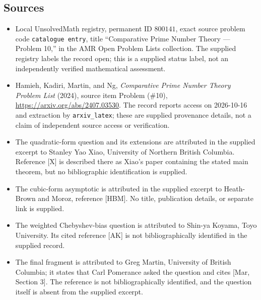 \documentclass[11pt]{article}
\begin{document}
\subsection{Sources}
\begin{itemize}
\item Local UnsolvedMath registry, permanent ID \(800141\), exact source problem code \texttt{catalogue entry}, title ``Comparative Prime Number Theory --- Problem 10,'' in the AMR Open Problem Lists collection. The supplied registry labels the record open; this is a supplied status label, not an independently verified mathematical assessment.
\item Hamieh, Kadiri, Martin, and Ng, \emph{Comparative Prime Number Theory Problem List} (2024), source item Problem (\#10), \url{https://arxiv.org/abs/2407.03530}. The record reports access on 2026-10-16 and extraction by \texttt{arxiv\_latex}; these are supplied provenance details, not a claim of independent source access or verification.
\item The quadratic-form question and its extensions are attributed in the supplied excerpt to Stanley Yao Xiao, University of Northern British Columbia. Reference [X] is described there as Xiao's paper containing the stated main theorem, but no bibliographic identification is supplied.
\item The cubic-form asymptotic is attributed in the supplied excerpt to Heath-Brown and Moroz, reference [HBM]. No title, publication details, or separate link is supplied.
\item The weighted Chebyshev-bias question is attributed to Shin-ya Koyama, Toyo University. Its cited reference [AK] is not bibliographically identified in the supplied record.
\item The final fragment is attributed to Greg Martin, University of British Columbia; it states that Carl Pomerance asked the question and cites [Mar, Section 3]. The reference is not bibliographically identified, and the question itself is absent from the supplied excerpt.
\end{itemize}
\end{document}
